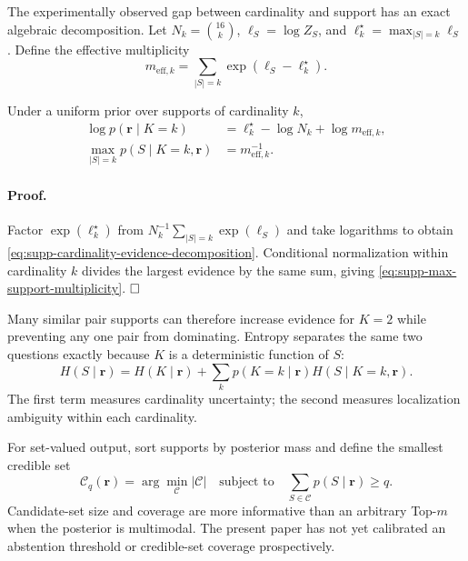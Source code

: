 The experimentally observed gap between cardinality and support has an exact algebraic decomposition. Let $N_k=\binom{16}{k}$, $\ell_S=\log Z_S$, and $\ell_k^{\star}=\max_{|S|=k}\ell_S$. Define the effective multiplicity
\begin{equation}
 m_{\mathrm{eff},k}=\sum_{|S|=k}\exp(\ell_S-\ell_k^{\star}).
 \label{eq:supp-effective-multiplicity}
\end{equation}

\begin{proposition}
Under a uniform prior over supports of cardinality $k$,
\begin{align}
 \log p(\bm r\mid K=k)
 &=\ell_k^{\star}-\log N_k+\log m_{\mathrm{eff},k},
 \label{eq:supp-cardinality-evidence-decomposition}\\
 \max_{|S|=k}p(S\mid K=k,\bm r)
 &=m_{\mathrm{eff},k}^{-1}.
 \label{eq:supp-max-support-multiplicity}
\end{align}
\end{proposition}

\paragraph{Proof.}
Factor $\exp(\ell_k^{\star})$ from
$N_k^{-1}\sum_{|S|=k}\exp(\ell_S)$ and take logarithms to obtain \eqref{eq:supp-cardinality-evidence-decomposition}. Conditional normalization within cardinality $k$ divides the largest evidence by the same sum, giving \eqref{eq:supp-max-support-multiplicity}. $\hfill\square$

Many similar pair supports can therefore increase evidence for $K=2$ while preventing any one pair from dominating. Entropy separates the same two questions exactly because $K$ is a deterministic function of $S$:
\begin{equation}
 H(S\mid\bm r)=H(K\mid\bm r)
 +\sum_kp(K=k\mid\bm r)H(S\mid K=k,\bm r).
 \label{eq:supp-support-entropy-decomposition}
\end{equation}
The first term measures cardinality uncertainty; the second measures localization ambiguity within each cardinality.

For set-valued output, sort supports by posterior mass and define the smallest credible set
\begin{equation}
 \mathcal C_q(\bm r)=\arg\min_{\mathcal C}|\mathcal C|
 \quad\text{subject to}\quad
 \sum_{S\in\mathcal C}p(S\mid\bm r)\ge q.
 \label{eq:supp-credible-support-set}
\end{equation}
Candidate-set size and coverage are more informative than an arbitrary Top-$m$ when the posterior is multimodal. The present paper has not yet calibrated an abstention threshold or credible-set coverage prospectively.

